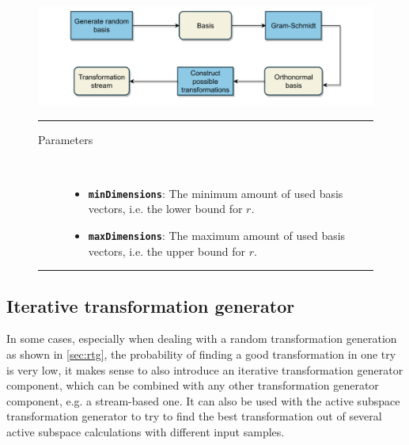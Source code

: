 \documentclass[
  a4paper,  %
  twoside,  %
  bibliography=totoc,
  headsepline,
  cleardoublepage=empty,
  parskip=half,
  draft=false
]{scrbook}
\newcommand{\delimit}{{\color{charcoal}\noindent\rule{\textwidth}{1pt}}}
\begin{document}
\begin{mdframed}[style=style,frametitle={Transformation stream generator (random)}]
\begin{figure}[H]

\vspace{5px}
\includegraphics[width=\textwidth]{graphics/TransformationStreamGen_Random.pdf}

\delimit
\begin{description}
\item[Parameters] {~ \begin{itemize}[\indent{}]
\item \texttt{\textbf{minDimensions}}: The minimum amount of used basis vectors, i.e. the lower bound for $r$.
\item \texttt{\textbf{maxDimensions}}: The maximum amount of used basis vectors, i.e. the upper bound for $r$.
\end{itemize}}
\end{description}
\delimit
{}
\label{fig:rtsg}
\end{figure}
\end{mdframed}

\newpage

\subsection {Iterative transformation generator}

In some cases, especially when dealing with a random transformation generation as shown in \cref{sec:rtg}, the probability of finding a good transformation in one try is very low, it makes sense to also introduce an iterative transformation generator component, which can be combined with any other transformation generator component, e.g. a stream-based one.
It can also be used with the active subspace transformation generator to try to find the best transformation out of several active subspace calculations with different input samples.
\end{document}
